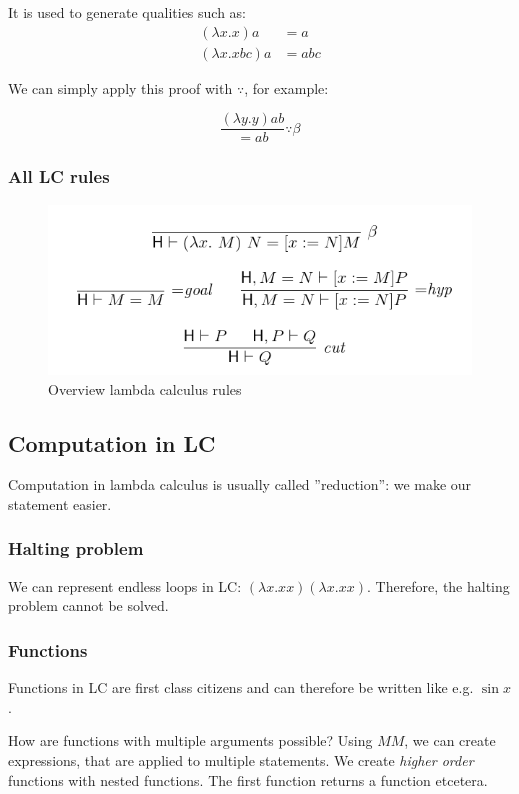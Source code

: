 It is used to generate qualities such as:
\begin{align*}
(\lambda x.x) a &= a \\
(\lambda x . x b c) a &= a b c
\end{align*}

We can simply apply this proof with $\because$, for example:

\[
	\frac{(\lambda y.y) a b}{= a b} \because \beta
\]

\subsubsection{All LC rules}

\begin{figure}[H]
\centering
\includegraphics[width=0.7\linewidth]{images/lc_rules}
\caption{Overview lambda calculus rules}
\label{fig:lcrules}
\end{figure}


\subsection{Computation in LC}
Computation in lambda calculus is usually called ''reduction'': we make our statement easier.

\subsubsection{Halting problem}

We can represent endless loops in LC: $(\lambda x. x x) (\lambda x . x x)$. Therefore, the halting problem cannot be solved.

\subsubsection{Functions}

Functions in LC are first class citizens and can therefore be written like e.g. $\sin x$.

How are functions with multiple arguments possible? Using $M M$, we can create expressions, that are applied to multiple statements. We create \emph{higher order} functions with nested functions. The first function returns a function etcetera.



